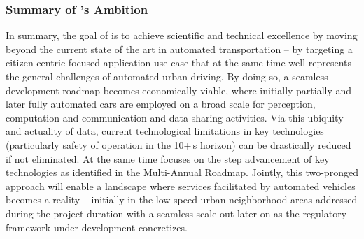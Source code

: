 \subsubsection{Summary of \Project 's Ambition}
In summary, the goal of \Project{} is to achieve scientific and technical excellence by moving beyond the current state of the art in automated transportation -- by targeting a citizen-centric focused application use case that at the same time well represents the general challenges of automated urban driving. By doing so, a seamless development roadmap becomes economically viable, where initially partially and later fully automated cars are employed on a broad scale for perception, computation and communication and data sharing activities. Via this ubiquity and actuality of data, current technological limitations in key technologies (particularly \wrt safety of operation in the 10+\,s horizon) can be drastically reduced if not eliminated. At the same time \Project{} focuses on the step advancement of key technologies as identified in the Multi-Annual Roadmap. Jointly, this two-pronged approach will enable a landscape where services facilitated by automated vehicles becomes a reality -- initially in the low-speed urban neighborhood areas addressed during the project duration with a seamless scale-out later on as the regulatory framework under development concretizes.

